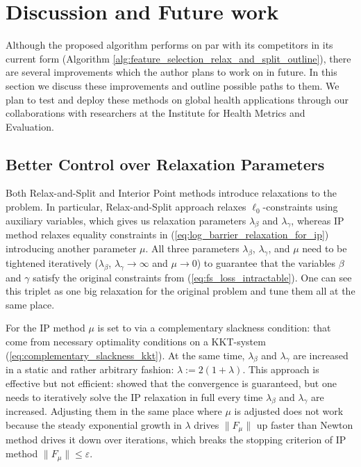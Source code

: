 \documentclass[11pt,letterpaper]{article}
\numberwithin{equation}{section} %
\numberwithin{figure}{section} %
\numberwithin{table}{section} %
\begin{document}
\newpage
\section{Discussion and Future work}
\label{ch:future_work}

Although the proposed algorithm performs on par with its competitors in its current form (Algorithm \ref{alg:feature_selection_relax_and_split_outline}), there are several improvements which the author plans to work on in future. In this section we discuss these improvements and outline possible paths to them. We plan to test and deploy these methods on global health applications through our collaborations with researchers at the Institute for Health Metrics and Evaluation. 

\subsection{Better Control over Relaxation Parameters}

Both Relax-and-Split and Interior Point methods introduce relaxations to the problem. In particular, Relax-and-Split approach relaxes $\ell_0$-constraints using auxiliary variables, which gives us relaxation parameters $\lambda_\beta$ and $\lambda_\gamma$, whereas IP method relaxes equality constraints in (\ref{eq:log_barrier_relaxation_for_ip}) introducing another parameter $\mu$. All three parameters $\lambda_\beta$, $\lambda_\gamma$, and $\mu$ need to be tightened iteratively ($\lambda_\beta$, $\lambda_\gamma \to \infty$ and $\mu \to 0$) to guarantee that the variables $\beta$ and $\gamma$ satisfy the original constraints from (\ref{eq:fs_loss_intractable}). One can see this triplet as one big relaxation for the original problem and tune them all at the same place. 

 For the IP method $\mu$ is set to via a complementary slackness condition:
 that come from necessary optimality conditions on a KKT-system (\ref{eq:complementary_slackness_kkt}). At the same time, $\lambda_\beta$ and $\lambda_\gamma$ are increased in a static and rather arbitrary fashion: $\lambda := 2(1+\lambda)$. This approach is effective but not efficient: \cite{Zheng2018RelaxAndSplit} showed that the convergence is guaranteed, but one needs to iteratively solve the IP relaxation in full every time $\lambda_\beta$ and $\lambda_\gamma$ are increased. Adjusting them in the same place where $\mu$ is adjusted does not work because the steady exponential growth in $\lambda$ drives $\|F_\mu\|$ up faster than Newton method drives it down over iterations, which breaks the stopping criterion of IP method $\|F_\mu\| \leq \varepsilon$.\\
\end{document}
